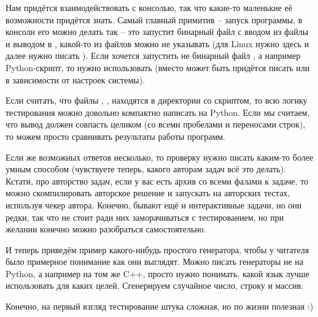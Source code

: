 Нам придётся взаимодействовать с консолью, так что какие-то маленькие её возможности придётся знать. Самый главный примитив -- запуск программы, в консоли его можно делать так  -- это запустит бинарный файл  с вводом из файлы  и выводом в , какой-то из файлов можно не указывать (для Linux нужно здесь и далее нужно писать ). Если хочется запустить не бинарный файл , а например Python-скрипт, то нужно использовать  (вместо  может быть придётся писать  или  в зависимости от настроек системы).

Если считать, что файлы , ,  находятся в директории со скриптом, то всю логику тестирования можно довольно компактно написать на Python. Если мы считаем, что вывод должен совпасть целиком (со всеми пробелами и переносами строк), то можем просто сравнивать результаты работы программ.


Если же возможных ответов несколько, то проверку нужно писать каким-то более умным способом (чувствуете теперь, какого авторам задач всё это делать). Кстати, про авторство задач, если у вас есть архив со всеми фалами к задаче, то можно скомпилировать авторское решение и запускать на авторских тестах, используя чекер автора. Конечно, бывают ещё и интерактивные задачи, но они редки, так что не стоит ради них заморачиваться с тестированием, но при желании конечно можно разобраться самостоятельно.

И теперь приведём пример какого-нибудь простого генератора, чтобы у читателя было примерное понимание как они выглядят. Можно писать генераторы не на Python, а например на том же C++, просто нужно понимать, какой язык лучше использовать для каких целей. Сгенерируем случайное число, строку и массив:


Конечно, на первый взгляд тестирование штука сложная, но по жизни полезная :)
